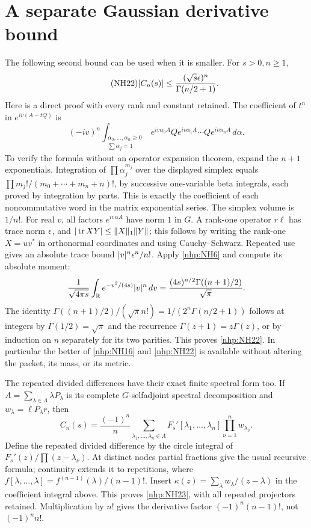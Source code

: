 \section{A separate Gaussian derivative bound}

The following second bound can be used when it is smaller.
For \(s>0,n\ge1\),
\begin{equation}\tag{NH22}\label{nhp:NH22}
|C_n(s)|\le
\frac{(\sqrt{s}\epsilon)^n}{\Gamma(n/2+1)} .
\end{equation}
Here is a direct proof with every rank and constant retained.
The coefficient of \(t^n\) in \(e^{iv(A-tQ)}\) is
\[
(-iv)^n\int_{\substack{\alpha_0,\ldots,\alpha_n\ge0\\
                       \sum\alpha_j=1}}
e^{iv\alpha_0A}Qe^{iv\alpha_1A}\cdots
Qe^{iv\alpha_nA}\,d\alpha .
\]
To verify the formula without an operator expansion theorem,
expand the \(n+1\) exponentials. Integration of
\(\prod\alpha_j^{m_j}\) over the displayed simplex equals
\(\prod m_j!/(m_0+\cdots+m_n+n)!\), by successive
one-variable beta integrals, each proved by integration
by parts. This is exactly the coefficient of each
noncommutative word in the matrix exponential series.
The simplex volume is \(1/n!\).
For real \(v\), all factors \(e^{iv\alpha A}\) have
norm \(1\) in \(G\). A rank-one operator \(r\ell\)
has trace norm \(\epsilon\), and
\(|\operatorname{tr} XY|\le\|X\|_1\|Y\|\); this follows by writing
the rank-one \(X=uv^*\) in orthonormal coordinates and
using Cauchy--Schwarz. Repeated use gives an absolute
trace bound \(|v|^n\epsilon^n/n!\).
Apply \eqref{nhp:NH6} and compute its absolute moment:
\[
\frac1{\sqrt{4\pi s}}\int_\mathbb R
e^{-v^2/(4s)}|v|^n\,dv
=\frac{(4s)^{n/2}\Gamma((n+1)/2)}{\sqrt\pi}.
\]
The identity
\(\Gamma((n+1)/2)/(\sqrt\pi n!)
=1/(2^n\Gamma(n/2+1))\) follows at integers by
\(\Gamma(1/2)=\sqrt\pi\) and the recurrence
\(\Gamma(z+1)=z\Gamma(z)\), or by induction on \(n\)
separately for its two parities.
This proves \eqref{nhp:NH22}. In particular the better of
\eqref{nhp:NH16} and \eqref{nhp:NH22} is available without
altering the packet, its mass, or its metric.

The repeated divided differences have their exact finite
spectral form too. If
\(A=\sum_{\lambda\in\Lambda}\lambda P_\lambda\) is its
complete \(G\)-selfadjoint spectral decomposition and
\(w_\lambda=\ell P_\lambda r\), then
\begin{equation}\tag{NH23}\label{nhp:NH23}
C_n(s)=\frac{(-1)^n}{n}
\sum_{\lambda_1,\ldots,\lambda_n\in\Lambda}
F_s'[\lambda_1,\ldots,\lambda_n]
\prod_{\nu=1}^n w_{\lambda_\nu}.
\end{equation}
Define the repeated divided difference by the circle
integral of \(F_s'(z)/\prod(z-\lambda_\nu)\).
At distinct nodes partial fractions give the usual
recursive formula; continuity extends it to repetitions,
where \(f[\lambda,\ldots,\lambda]=f^{(n-1)}(\lambda)/(n-1)!\).
Insert
\(\kappa(z)=\sum_\lambda w_\lambda/(z-\lambda)\)
in the coefficient integral above. This proves
\eqref{nhp:NH23}, with all repeated projectors retained.
Multiplication by \(n!\) gives the derivative factor
\((-1)^n(n-1)!\), not \((-1)^nn!\).

